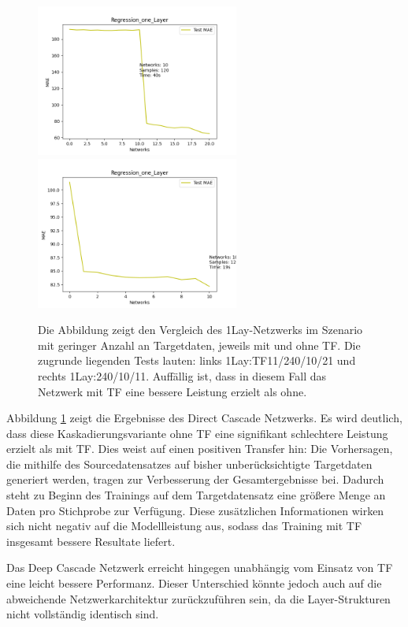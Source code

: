\begin{figure}[htpb]
    \includegraphics[height=5cm]{../../Plots/ba_plots/regression_small/onelayer_ts.png}
    \includegraphics[height=5cm]{../../Plots/ba_plots/regression_small/woonelayer_ts.png}
    \caption{\label{fig:smallonl} 
    \small{Die Abbildung zeigt den Vergleich des 1Lay-Netzwerks im Szenario mit geringer Anzahl an Targetdaten, jeweils mit und ohne TF. Die 
    zugrunde liegenden Tests lauten: links 1Lay:TF11/240/10/21 und rechts 1Lay:240/10/11. Auffällig ist, dass in diesem Fall das Netzwerk mit 
    TF eine bessere Leistung erzielt als ohne.}}
\end{figure}

Abbildung \ref{fig:smallonl} zeigt die Ergebnisse des Direct Cascade Netzwerks. Es wird deutlich, dass diese Kaskadierungsvariante ohne TF eine 
signifikant schlechtere Leistung erzielt als mit TF. Dies weist auf einen positiven Transfer hin: Die Vorhersagen, die mithilfe des 
Sourcedatensatzes auf bisher unberücksichtigte Targetdaten generiert werden, tragen zur Verbesserung der Gesamtergebnisse bei. Dadurch steht zu 
Beginn des Trainings auf dem Targetdatensatz eine größere Menge an Daten pro Stichprobe zur Verfügung. Diese zusätzlichen Informationen wirken 
sich nicht negativ auf die Modellleistung aus, sodass das Training mit TF insgesamt bessere Resultate liefert.

Das Deep Cascade Netzwerk erreicht hingegen unabhängig vom Einsatz von TF eine leicht bessere Performanz. Dieser Unterschied könnte jedoch auch 
auf die abweichende Netzwerkarchitektur zurückzuführen sein, da die Layer-Strukturen nicht vollständig identisch sind.

